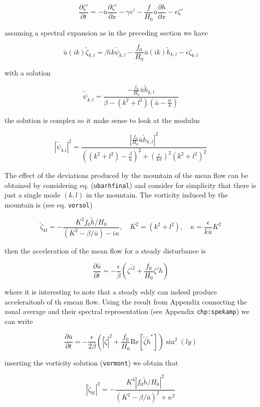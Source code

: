 {\[\frac{\partial \zeta'}{\partial t}= -\bar{u}\frac{\partial \zeta'}{\partial x}-\gamma v'-\frac{f}{H_0}\bar{u}\frac{\partial h}{\partial x} -\epsilon\zeta'\]}

assuming a spectral expansion as in the preceding section we have

\[\bar{u}(ik) \tilde{\zeta}_{k,l} = \beta ik\tilde{\psi}_{k,l} -\frac{f_0}{H_0}\bar{u}(i k )\tilde{h}_{k,l} -\epsilon \zeta_{k,l}\]

with a solution

\[\tilde{\psi}_{k,l} =\frac{\displaystyle -\frac{f_0}{H_0}\bar{u}\tilde{h}_{k,l}}{\displaystyle \beta -(k^2+l^2)(\bar{u}-\frac{i\epsilon}{k})}\]

the solution is complex so it make sense to look at the modulus

\[|\tilde{\psi}_{k.l}|^2 = \frac{\displaystyle \left|\frac{f_0}{H_0}\bar{u}\tilde{h}_{k,l}\right|^2}{\displaystyle \left((k^2+l^2)-\frac{\beta}{\bar{u}}\right)^2 +  \left(\frac{\epsilon}{k\pi}\right)^2(k^2+l^2)^2}\]

The effect of the deviations produced by the mountain of the mean flow
can be obtained by considering eq. (\texttt{ubarhfinal}) and consider
for simplicity that there is just a single mode \((k,l)\) in the
mountain. The vorticity induced by the mountain is (see eq.
\texttt{vorsol})

{\[\tilde{\zeta}_{kl} = -\frac{K^2 f_0 \tilde{h}/H_0}{(K^2-\beta/\bar{u}) - i\kappa}, \quad K^2=(k^2+l^2) ,\quad \kappa =\frac{\epsilon}{k\bar{u}}K^2\]}

then the acceleration of the mean flow for a steady disturbance is

{\[\frac{\partial \bar{u}}{\partial t}=  -\frac{\epsilon}{\beta}\left( \overline{\zeta'^2}+ \frac{f_0}{H_0}\overline{\zeta'h}\right)\]}

where it is interesting to note that a steady eddy can indeed produce
acceleraitonb of th emean flow. Using the result from Appendix
connecting the zonal average and their spectral representation (see
Appendix \texttt{chp:spekamp}) we can write

\[\frac{\partial \bar{u}}{\partial t}=  -\frac{\epsilon}{2 \beta}\left( |\tilde{\zeta}|^2 + \frac{f_0}{H_0}\mathrm{Re}\left[ \tilde{\zeta}\tilde{h}^*\right]\right)\sin^2(l y)\]

inserting the vorticity solution (\texttt{vormont}) we obtain that

\[|\tilde{\zeta}_{kl}|^2 = -\frac{K^4 |f_0 \tilde{h}/H_0|^2}{(K^2-\beta/\bar{u})^2  + \kappa^2}\]

